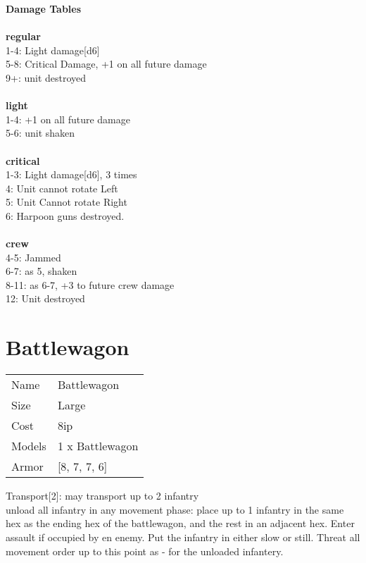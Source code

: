 {\bf Damage Tables} \\
\ \\ {\bf regular } \\
1-4: Light damage[d6] \\
5-8: Critical Damage, +1 on all future damage \\
9+: unit destroyed \\
\ \\ {\bf light } \\
1-4: +1 on all future damage \\
5-6: unit shaken \\
\ \\ {\bf critical } \\
1-3: Light damage[d6], 3 times \\
4: Unit cannot rotate Left \\
5: Unit Cannot rotate Right \\
6: Harpoon guns destroyed. \\
\ \\ {\bf crew } \\
4-5: Jammed \\
6-7: as 5, shaken \\
8-11: as 6-7, +3 to future crew damage \\
12: Unit destroyed \\










\pagebreak\pagebreak

\section{ Battlewagon }

\begin{tabular}{ll}
  Name & Battlewagon \\
  Size & Large\\
  Cost & 8ip\\
  Models & 1 x Battlewagon\\
  Armor & [8, 7, 7, 6]\\
\end{tabular}

\noindent Transport[2]: may transport up to 2 infantry\\ 
unload all infantry in any movement phase: place up to 1 infantry in the same hex as the ending hex of the battlewagon, and the rest in an adjacent hex. Enter assault if occupied by en enemy. Put the infantry in either slow or still. Threat all movement order up to this point as - for the unloaded infantery.\\ 



